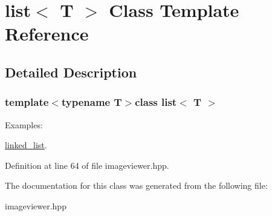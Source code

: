 \hypertarget{classlist}{\section{list$<$ T $>$ Class Template Reference}
\label{classlist}
}


\subsection{Detailed Description}
\subsubsection*{template$<$typename T$>$class list$<$ T $>$}

\begin{Desc}
\item[Examples\-: ]\par
\hyperlink{linked_list-example}{linked\-\_\-list}.\end{Desc}


Definition at line 64 of file imageviewer.\-hpp.



The documentation for this class was generated from the following file\-:\begin{DoxyCompactItemize}
\item 
imageviewer.\-hpp\end{DoxyCompactItemize}
